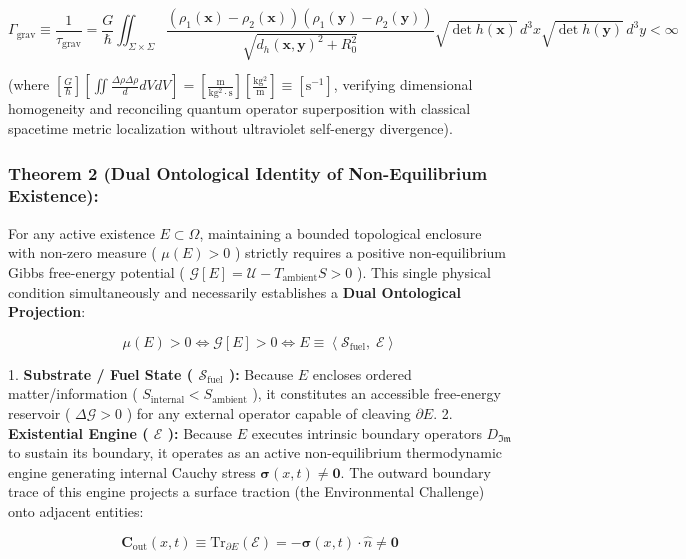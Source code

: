 \documentclass[11pt,a4paper]{article}
\theoremstyle{definition}\newtheorem{definition}{Definition}
\theoremstyle{remark}\newtheorem{remark}{Remark}
\begin{document}
\begin{equation}
\boxed{\Gamma_{\text{grav}} \equiv \frac{1}{\tau_{\text{grav}}} = \frac{G}{\hbar} \iint_{\Sigma \times \Sigma} \frac{\left( \rho_1(\mathbf{x}) - \rho_2(\mathbf{x}) \right) \left( \rho_1(\mathbf{y}) - \rho_2(\mathbf{y}) \right)}{\sqrt{d_h(\mathbf{x}, \mathbf{y})^2 + R_0^2}} \sqrt{\det h(\mathbf{x})} \, d^3x \sqrt{\det h(\mathbf{y})} \, d^3y < \infty}
\end{equation}


(where $[\frac{G}{\hbar}][\iint \frac{\Delta\rho\Delta\rho}{d} dV dV] = [\frac{\mathrm{m}}{\mathrm{kg^2 \cdot s}}][\frac{\mathrm{kg^2}}{\mathrm{m}}] \equiv [\mathrm{s^{-1}}]$, verifying dimensional homogeneity and reconciling quantum operator superposition with classical spacetime metric localization without ultraviolet self-energy divergence).
\subsubsection{Theorem 2 (Dual Ontological Identity of Non-Equilibrium Existence):}

For any active existence $E \subset \Omega$, maintaining a bounded topological enclosure with non-zero measure ( $\mu(E) > 0$ ) strictly requires a positive non-equilibrium Gibbs free-energy potential ( $\mathcal{G}[E] = \mathcal{U} - T_{\text{ambient}} S > 0$ ). This single physical condition simultaneously and necessarily establishes a \textbf{Dual Ontological Projection}:


\begin{equation}
\boxed{\mu(E) > 0 \iff \mathcal{G}[E] > 0 \iff E \equiv \left\langle \mathcal{S}_{\text{fuel}}, \; \mathcal{E} \right\rangle}
\end{equation}


1. \textbf{Substrate / Fuel State ( $\mathcal{S}_{\text{fuel}}$ ):} Because $E$ encloses ordered matter/information ( $S_{\text{internal}} < S_{\text{ambient}}$ ), it constitutes an accessible free-energy reservoir ( $\Delta \mathcal{G} > 0$ ) for any external operator capable of cleaving $\partial E$.
2. \textbf{Existential Engine ( $\mathcal{E}$ ):} Because $E$ executes intrinsic boundary operators $D_{\mathfrak{Im}}$ to sustain its boundary, it operates as an active non-equilibrium thermodynamic engine generating internal Cauchy stress $\boldsymbol{\sigma}(x, t) \neq \mathbf{0}$. The outward boundary trace of this engine projects a surface traction (the Environmental Challenge) onto adjacent entities:


\begin{equation}
\mathbf{C}_{\text{out}}(x, t) \equiv \mathrm{Tr}_{\partial E}\left(\mathcal{E}\right) = -\boldsymbol{\sigma}(x, t) \cdot \hat{n} \neq \mathbf{0}
\end{equation}
\end{document}
